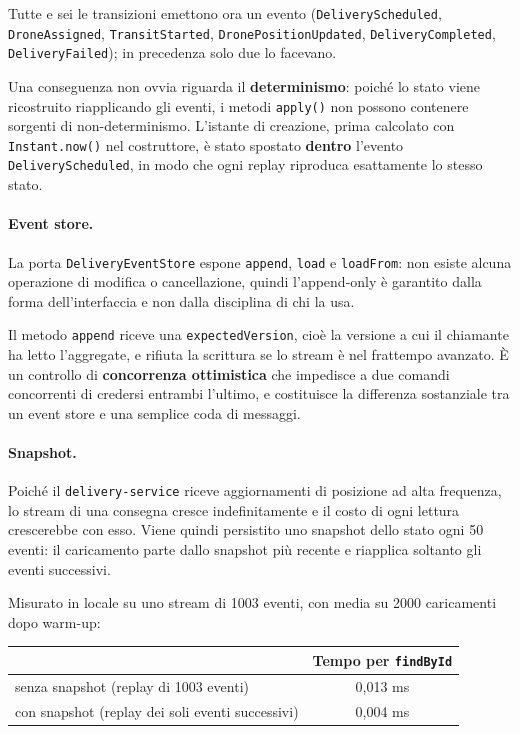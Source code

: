\documentclass[12pt,a4paper]{article}
\begin{document}
Tutte e sei le transizioni emettono ora un evento (\texttt{DeliveryScheduled},
\texttt{DroneAssigned}, \texttt{TransitStarted}, \texttt{DronePositionUpdated},
\texttt{DeliveryCompleted}, \texttt{DeliveryFailed}); in precedenza solo due lo facevano.

Una conseguenza non ovvia riguarda il \textbf{determinismo}: poich\'e lo stato viene ricostruito
riapplicando gli eventi, i metodi \texttt{apply()} non possono contenere sorgenti di
non-determinismo. L'istante di creazione, prima calcolato con \texttt{Instant.now()} nel costruttore,
\`e stato spostato \textbf{dentro} l'evento \texttt{DeliveryScheduled}, in modo che ogni replay
riproduca esattamente lo stesso stato.

\paragraph{Event store.} La porta \texttt{DeliveryEventStore} espone \texttt{append}, \texttt{load} e
\texttt{loadFrom}: non esiste alcuna operazione di modifica o cancellazione, quindi l'append-only
\`e garantito dalla forma dell'interfaccia e non dalla disciplina di chi la usa.

Il metodo \texttt{append} riceve una \texttt{expectedVersion}, cio\`e la versione a cui il chiamante
ha letto l'aggregate, e rifiuta la scrittura se lo stream \`e nel frattempo avanzato. \`E un
controllo di \textbf{concorrenza ottimistica} che impedisce a due comandi concorrenti di credersi
entrambi l'ultimo, e costituisce la differenza sostanziale tra un event store e una semplice coda di
messaggi.

\paragraph{Snapshot.} Poich\'e il \texttt{delivery-service} riceve aggiornamenti di posizione ad alta
frequenza, lo stream di una consegna cresce indefinitamente e il costo di ogni lettura crescerebbe
con esso. Viene quindi persistito uno snapshot dello stato ogni 50 eventi: il caricamento parte dallo
snapshot pi\`u recente e riapplica soltanto gli eventi successivi.

Misurato in locale su uno stream di 1003 eventi, con media su 2000 caricamenti dopo warm-up:

\begin{table}[H]
\centering
\begin{tabular}{lc}
\toprule
& \textbf{Tempo per \texttt{findById}} \\
\midrule
senza snapshot (replay di 1003 eventi) & 0,013 ms \\
con snapshot (replay dei soli eventi successivi) & 0,004 ms \\
\bottomrule
\end{tabular}
\end{table}
\end{document}
